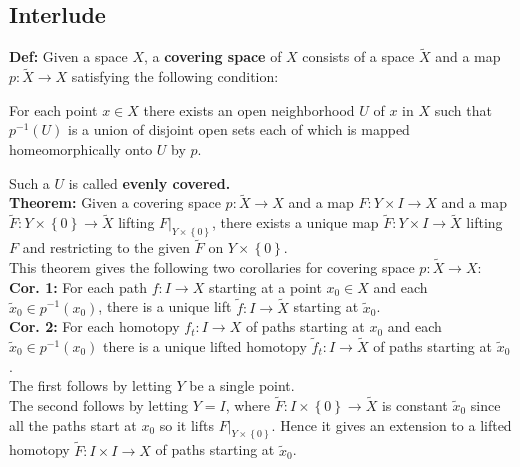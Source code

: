 \documentclass[a4paper]{article}
\begin{document}
 \subsection*{Interlude}

 \textbf{Def:} Given a space $X$, a \textbf{covering space} of $X$ consists
 of a space $\tilde{X}$ and a map $p  \colon \tilde{X}\to X$ satisfying the
 following condition:
 \begin{center}
     For each point $x \in X$ there exists an open neighborhood $U$ of $x$ in
     $X$ such that $p^{-1}(U)$ is a union of disjoint open sets each of which
     is mapped homeomorphically onto $U$ by $p$.
 \end{center}
 Such a $U$ is called \textbf{evenly covered.}\\
 \linebreak
 \textbf{Theorem:} Given a covering space $p  \colon \tilde{X}\to X$ and a map
 $F  \colon Y \times I \to X$ and a map $\tilde{F}  \colon Y \times \left\{ 0 \right\}
 \to \tilde{X}$ lifting $F|_{Y \times \left\{ 0 \right\} }$, there exists
 a unique map $\tilde{F}  \colon Y \times I \to \tilde{X}$ lifting
 $F$ and restricting to the given $\tilde{F}$ on $Y \times \left\{ 0 \right\}
 $.\\
 \linebreak
 This theorem gives the following two corollaries for covering space
 $p  \colon \tilde{X}\to X$:\\
 \textbf{Cor. 1:} For each path $f  \colon I \to X$ starting at a point $x_0
 \in X$ and each $\tilde{x}_0 \in p^{-1}(x_0)$, there
 is a unique lift $\tilde{f}  \colon I \to \tilde{X}$ starting at
 $\tilde{x}_0$.\\
 \linebreak
 \textbf{Cor. 2:} For each homotopy $f_t  \colon I \to X$ of paths starting at
 $x_0$ and each $\tilde{x}_0 \in p^{-1}(x_0)$ there is a unique lifted homotopy 
 $\tilde{f}_t  \colon I \to \tilde{X}$ of paths starting at $\tilde{x}_0$.\\
 \linebreak
 The first follows by letting $Y$ be a single point.\\
 The second follows by letting $Y = I$, where
 $\tilde{F} \colon I \times \left\{ 0 \right\} \to \tilde{X}$ is constant
 $\tilde{x}_0$ since all the paths start at $x_0$ so it lifts
 $F|_{Y \times \left\{ 0 \right\} }$. Hence it gives an extension to a lifted
 homotopy
 $\tilde{F}  \colon I \times I \to X$ of paths starting at
 $\tilde{x}_0$.\\
 \linebreak
 
\end{document}
